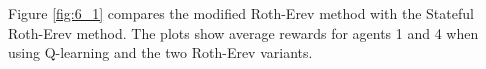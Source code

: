 
Figure \ref{fig:6_1} compares the modified Roth-Erev method with the Stateful
Roth-Erev method.  The plots show average rewards for agents 1 and 4 when
using Q-learning and the two Roth-Erev variants.

